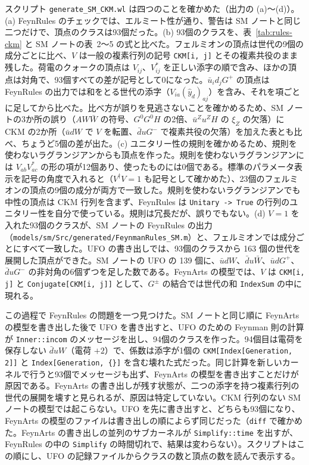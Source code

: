 \documentclass[a4paper,10pt]{ltjsarticle}
\begin{document}
スクリプト \texttt{generate\_SM\_CKM.wl} は四つのことを確かめた（出力の (a)〜(d)）。(a) FeynRules のチェックでは、エルミート性が通り、警告は SM ノートと同じ二つだけで、頂点のクラスは93個だった。(b) 93個のクラスを、表~\ref{tab:rules-ckm} と SM ノートの表~2〜5 の式と比べた。フェルミオンの頂点は世代の9個の成分ごとに比べ、$V$ は一般の複素行列の記号 \texttt{CKM[i, j]} とその複素共役のまま残した。荷電のクォークの頂点は $V_{ij}$、$V_{ij}^*$ を正しい添字の順で含み、ほかの頂点は対角で、93個すべての差が記号として0になった。$\bar u_id_jG^+$ の頂点は FeynRules の出力では和をとる世代の添字（$V_{ia}(\hat y_d)_{aj}$）を含み、それを項ごとに足してから比べた。比べ方が誤りを見逃さないことを確かめるため、SM ノートの3か所の誤り（$AW\bar W$ の符号、$G^0G^0H$ の2倍、$\bar u^Zu^ZH$ の $\xi_Z$ の欠落）に CKM の2か所（$\bar udW$ で $V$ を転置、$\bar duG^-$ で複素共役の欠落）を加えた表とも比べ、ちょうど5個の差が出た。(c) ユニタリー性の規則を確かめるため、規則を使わないラグランジアンからも頂点を作った。規則を使わないラグランジアンには $V_{ab}V_{ac}^*$ の形の項が12個あり、使ったものには0個である。標準のパラメータ表示を記号の角度で入れると（$V^\dagger V=1$ も記号として確かめた）、23個のフェルミオンの頂点の9個の成分が両方で一致した。規則を使わないラグランジアンでも中性の頂点は CKM 行列を含まず、FeynRules は \texttt{Unitary -> True} の行列のユニタリー性を自分で使っている。規則は冗長だが、誤りでもない。(d) $V=1$ を入れた93個のクラスが、SM ノートの FeynRules の出力（\texttt{models/sm/Src/generated/FeynmanRules\_SM.m}）と、フェルミオンでは成分ごとにすべて一致した。UFO の書き出しでは、93個のクラスから 163 個の世代を展開した頂点ができた。SM ノートの UFO の 139 個に、$\bar udW$、$\bar du\bar W$、$\bar udG^+$、$\bar duG^-$ の非対角の6個ずつを足した数である。FeynArts の模型では、$V$ は \texttt{CKM[i, j]} と \texttt{Conjugate[CKM[i, j]]} として、$G^\pm$ の結合では世代の和 \texttt{IndexSum} の中に現れる。

この過程で FeynRules の問題を一つ見つけた。SM ノートと同じ順に FeynArts の模型を書き出した後で UFO を書き出すと、UFO のための Feynman 則の計算が \texttt{Inner::incom} のメッセージを出し、94個のクラスを作った。94個目は電荷を保存しない $\bar duW$（電荷 $+2$）で、係数は添字が1個の \texttt{CKM[Index[Generation, 2]]} と \texttt{Index[Generation, \{\}]} を含む壊れた式だった。同じ計算を新しいカーネルで行うと93個でメッセージも出ず、FeynArts の模型を書き出すことだけが原因である。FeynArts の書き出しが残す状態が、二つの添字を持つ複素行列の世代の展開を壊すと見られるが、原因は特定していない。CKM 行列のない SM ノートの模型では起こらない。UFO を先に書き出すと、どちらも93個になり、FeynArts の模型のファイルは書き出しの順によらず同じだった（\texttt{diff} で確かめた。FeynArts の書き出しの並列のサブカーネルが \texttt{Simplify::time} を出すが、FeynRules の中の \texttt{Simplify} の時間切れで、結果は変わらない）。スクリプトはこの順にし、UFO の記録ファイルからクラスの数と頂点の数を読んで表示する。
\end{document}
